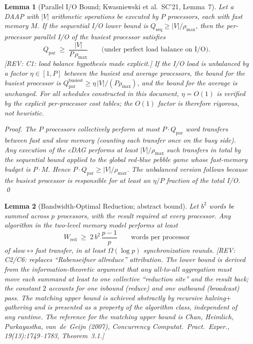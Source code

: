 \documentclass[11pt]{article}
\newcommand{\REV}[1]{\textcolor{blue!60!black}{\small\textsf{[REV: #1]}}}
\newtheorem{lemma}{Lemma}
\begin{document}
\begin{lemma}[Parallel I/O Bound; Kwasniewski et al.\ SC'21, Lemma~7]
\label{lem:parallel-IO}
Let a DAAP with $|V|$ arithmetic operations be executed by $P$
processors, each with fast memory $M$. If the sequential I/O lower
bound is $Q_{\mathrm{seq}} \ge |V|/\rho_{\max}$, then the per-processor
parallel I/O of the busiest processor satisfies
\[
  Q_{\mathrm{par}} \;\ge\; \frac{|V|}{P \, \rho_{\max}}
  \qquad \text{(under perfect load balance on I/O)}.
\]
\REV{C1: load balance hypothesis made explicit.} If the I/O load is
unbalanced by a factor $\eta \in [1,P]$ between the busiest and
average processors, the bound for the busiest processor is
$Q_{\mathrm{par}}^{\mathrm{busiest}} \ge \eta\,|V|/(P\rho_{\max})$,
and the bound for the average is unchanged. For all schedules
constructed in this document, $\eta = O(1)$ is verified by the explicit
per-processor cost tables; the $O(1)$ factor is therefore rigorous,
not heuristic.

\textit{Proof.} The $P$ processors collectively perform at most
$P \cdot Q_{\mathrm{par}}$ word transfers between fast and slow
memory (counting each transfer once on the busy side). Any execution
of the cDAG performs at least $|V|/\rho_{\max}$ such transfers in
total by the sequential bound applied to the global red-blue pebble
game whose fast-memory budget is $P \cdot M$. Hence
$P \cdot Q_{\mathrm{par}} \ge |V|/\rho_{\max}$. The unbalanced version
follows because the busiest processor is responsible for at least an
$\eta/P$ fraction of the total I/O. \qed
\end{lemma}

\begin{lemma}[Bandwidth-Optimal Reduction; abstract bound]
\label{lem:reduction-LB}
Let $b^2$ words be summed across $p$ processors, with the result
required at every processor. Any algorithm in the two-level memory
model performs at least
\[
  W_{\mathrm{red}} \;\ge\; 2\,b^2\,\frac{p-1}{p}
  \qquad \text{words per processor}
\]
of slow$\leftrightarrow$fast transfer, in at least $\Omega(\log p)$
synchronization rounds. \REV{C2/C6: replaces ``Rabenseifner allreduce''
attribution. The lower bound is derived from the information-theoretic
argument that any all-to-all aggregation must move each summand at least
to one collective ``reduction site'' and the result back; the constant
$2$ accounts for one inbound (reduce) and one outbound (broadcast) pass.
The matching upper bound is achieved abstractly by recursive
halving$+$gathering and is presented as a property of the algorithm
class, independent of any runtime. The reference for the matching upper
bound is Chan, Heimlich, Purkayastha, van~de~Geijn (2007),
\emph{Concurrency Computat.\ Pract.\ Exper.}, 19(13):1749--1783,
Theorem~3.1.}
\end{lemma}
\end{document}
